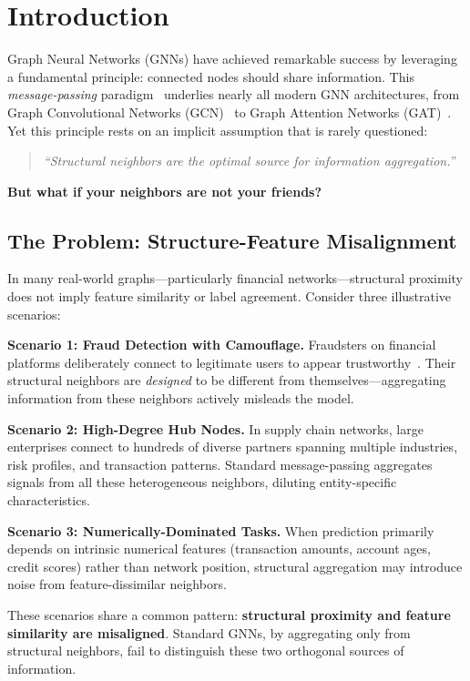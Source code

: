 \section{Introduction}

Graph Neural Networks (GNNs) have achieved remarkable success by leveraging a fundamental principle: connected nodes should share information. This \textit{message-passing} paradigm~\cite{gilmer2017mpnn} underlies nearly all modern GNN architectures, from Graph Convolutional Networks (GCN)~\cite{kipf2017gcn} to Graph Attention Networks (GAT)~\cite{velivckovic2018gat}. Yet this principle rests on an implicit assumption that is rarely questioned:

\begin{quote}
\textit{``Structural neighbors are the optimal source for information aggregation.''}
\end{quote}

\textbf{But what if your neighbors are not your friends?}

\subsection{The Problem: Structure-Feature Misalignment}

In many real-world graphs---particularly financial networks---structural proximity does not imply feature similarity or label agreement. Consider three illustrative scenarios:

\textbf{Scenario 1: Fraud Detection with Camouflage.} Fraudsters on financial platforms deliberately connect to legitimate users to appear trustworthy~\cite{dou2020enhancing}. Their structural neighbors are \textit{designed} to be different from themselves---aggregating information from these neighbors actively misleads the model.

\textbf{Scenario 2: High-Degree Hub Nodes.} In supply chain networks, large enterprises connect to hundreds of diverse partners spanning multiple industries, risk profiles, and transaction patterns. Standard message-passing aggregates signals from all these heterogeneous neighbors, diluting entity-specific characteristics.

\textbf{Scenario 3: Numerically-Dominated Tasks.} When prediction primarily depends on intrinsic numerical features (transaction amounts, account ages, credit scores) rather than network position, structural aggregation may introduce noise from feature-dissimilar neighbors.

These scenarios share a common pattern: \textbf{structural proximity and feature similarity are misaligned}. Standard GNNs, by aggregating only from structural neighbors, fail to distinguish these two orthogonal sources of information.

